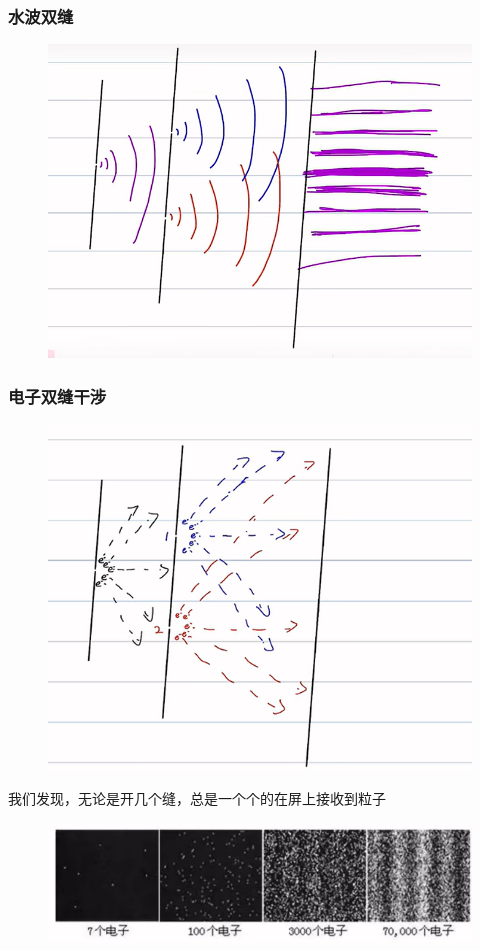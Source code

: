 \documentclass[lang=cn,10pt]{elegantbook}
\begin{document}
\subsubsection{水波双缝}
\begin{figure}[H]
	\centering
	\includegraphics[width=0.7\linewidth]{figure/screenshot005}
\end{figure}
\subsubsection{电子双缝干涉}
\begin{figure}[H]
	\centering
	\includegraphics[width=0.7\linewidth]{figure/screenshot006}
\end{figure}
我们发现，无论是开几个缝，总是一个个的在屏上接收到粒子
\begin{figure}[H]
	\centering
	\includegraphics[width=0.7\linewidth]{figure/screenshot007}
\end{figure}
\end{document}
